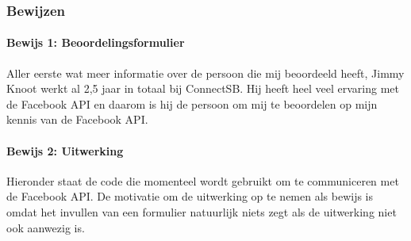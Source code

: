\subsubsection{Bewijzen}
\paragraph{Bewijs 1: Beoordelingsformulier}
Aller eerste wat meer informatie over de persoon die mij beoordeeld heeft, Jimmy Knoot werkt al 2,5 jaar in totaal bij ConnectSB. Hij heeft heel veel ervaring met de Facebook API en daarom is hij de persoon om mij te beoordelen op mijn kennis van de Facebook API.



\paragraph{Bewijs 2: Uitwerking}
Hieronder staat de code die momenteel wordt gebruikt om te communiceren met de Facebook API. De motivatie om de uitwerking op te nemen als bewijs is omdat het invullen van een formulier natuurlijk niets zegt als de uitwerking niet ook aanwezig is.

